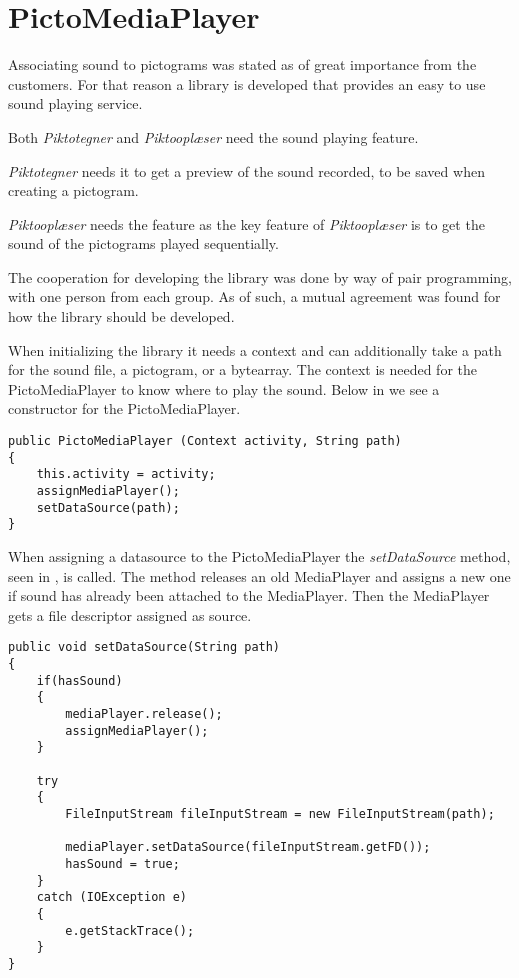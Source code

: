 \section{PictoMediaPlayer}
\label{sec:pictomediaplayer}
Associating sound to pictograms was stated as of great importance from the customers.
For that reason a library is developed that provides an easy to use sound playing service.

Both \textit{Piktotegner} and \textit{Piktooplæser} need the sound playing feature. 

\textit{Piktotegner} needs it to get a preview of the sound recorded, to be saved when creating a pictogram.

\textit{Piktooplæser} needs the feature as the key feature of \textit{Piktooplæser} is to get the sound of the pictograms played sequentially. 

The cooperation for developing the library was done by way of pair programming, with one person from each group.
As of such, a mutual agreement was found for how the library should be developed.

When initializing the library it needs a context and can additionally take a path for the sound file, a pictogram, or a bytearray. The context is needed for the PictoMediaPlayer to know where to play the sound. Below in  we see a constructor for the PictoMediaPlayer.

\begin{lstlisting}[caption={Constructor for PictoMediaPlayer.},label={lst:constructor}]
public PictoMediaPlayer (Context activity, String path)
{
    this.activity = activity;
    assignMediaPlayer();
    setDataSource(path);
}
\end{lstlisting}

When assigning a datasource to the PictoMediaPlayer the \textit{setDataSource} method, seen in , is called. The method releases an old MediaPlayer and assigns a new one if sound has already been attached to the MediaPlayer.
Then the MediaPlayer gets a file descriptor assigned as source.

\begin{lstlisting}[caption={SetDataSource method of PictoMediaPlayer.},label={lst:setdatasource}]
public void setDataSource(String path)
{
    if(hasSound)
    {
        mediaPlayer.release();
        assignMediaPlayer();
    }

    try
    {
        FileInputStream fileInputStream = new FileInputStream(path);

        mediaPlayer.setDataSource(fileInputStream.getFD());
        hasSound = true;
    }
    catch (IOException e)
    {
        e.getStackTrace();
    }
}
\end{lstlisting}

